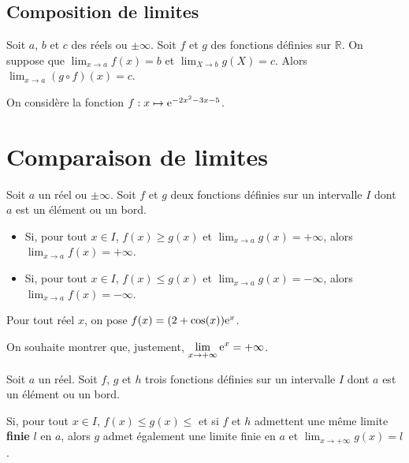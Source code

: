 \documentclass[11pt,fleqn, openany]{book} %
\begin{document}
\subsection{Composition de limites}

\begin{proposition}Soit $a$, $b$ et $c$ des réels ou $\pm \infty$. Soit $f$ et $g$ des fonctions définies sur $\mathbb{R}$.
On suppose que $\displaystyle\lim_{x \to a}f(x)=b$ et $\displaystyle\lim_{X \to b}g(X)=c$. Alors $\displaystyle\lim_{x \to a}(g \circ f)(x)=c$.
\end{proposition}


\begin{example} On considère la fonction $f:x\mapsto \mathrm{e}^{-2x^2-3x-5}$. 
\vskip50pt
\end{example}



\section{Comparaison de limites}

\begin{theorem}Soit $a$ un réel ou $\pm \infty$. Soit $f$ et $g$ deux fonctions définies sur un intervalle $I$ dont $a$ est un élément ou un bord.
\begin{itemize}
\item Si, pour tout $x\in I$, $f(x)\geqslant g(x)$ et $\displaystyle \lim_{x \to a} g(x)=+\infty$, alors $\displaystyle \lim_{x \to a} f(x)=+\infty$.
\item Si, pour tout $x\in I$, $f(x)\leqslant g(x)$ et $\displaystyle \lim_{x \to a} g(x)=-\infty$, alors $\displaystyle \lim_{x \to a} f(x)=-\infty$.
\end{itemize}\end{theorem}

\begin{example}Pour tout réel $x$, on pose $f(x)=(2+\cos(x))\mathrm{e}^x$. 

\vskip80pt
\end{example}

\begin{example}On souhaite montrer que, justement, $\displaystyle \lim_{x \to +\infty}\mathrm{e}^x=+\infty$. 

\vskip180pt
\end{example}

\newpage


\begin{theorem}Soit $a$ un réel. Soit $f$, $g$ et $h$ trois fonctions définies sur un intervalle $I$ dont $a$ est un élément ou un bord.

Si, pour tout $x\in I$, $f(x)\leqslant g(x)\leqslant$ et si $f$ et $h$ admettent une même limite \textbf{finie} $l$ en $a$, alors $g$ admet également une limite finie en $a$ et $\displaystyle \lim_{x \to +\infty} g(x)=l$.
\end{theorem}
\end{document}
